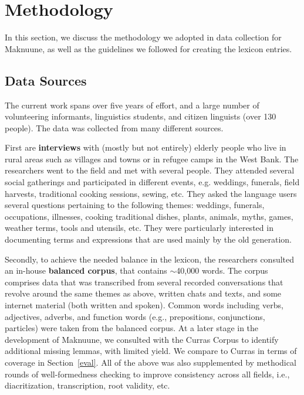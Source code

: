 
\section*{Methodology}
%
\label{method}
In this section, we discuss the methodology  we adopted in data collection for Maknuune, as well as the guidelines we followed for creating the lexicon entries.

\subsection*{Data Sources}
The current work spans over five years of effort, and a large number of volunteering informants, linguistics students, and citizen linguists (over 130 people).
The data was collected from many different sources.

First are \textbf{interviews} with (mostly but not entirely) elderly people  who live in rural areas such as villages and towns or in refugee camps in the West Bank.
%
The researchers went to the field and met with several people. 
They attended several social gatherings and participated in different events, e.g. weddings, funerals, field harvests, traditional cooking sessions, sewing, etc. They asked the language users several questions pertaining to the following themes: weddings, funerals, occupations, illnesses, cooking traditional dishes, plants, animals, myths, games, weather terms, tools and utensils, etc. They were particularly interested in documenting terms and expressions that are used mainly by the old generation. 

Secondly, to achieve the needed balance in the lexicon, the researchers consulted an in-house \textbf{balanced corpus}, that contains $\sim$40,000 words. The corpus comprises data that was transcribed from several recorded conversations that revolve around the same themes as above, written chats and texts, and some internet material (both written and spoken). Common words including verbs, adjectives, adverbs, and function words (e.g., prepositions, conjunctions, particles) were taken from the balanced corpus. At a later stage in the development of Maknuune, we consulted with the Curras Corpus \citep{Jarrar:2016:curras} to identify additional missing lemmas, with limited yield. We compare to Curras in terms of coverage in  Section~\ref{eval}. All of the above was also supplemented by methodical rounds of well-formedness checking to improve consistency across all fields, i.e., diacritization, transcription, root validity, etc.

